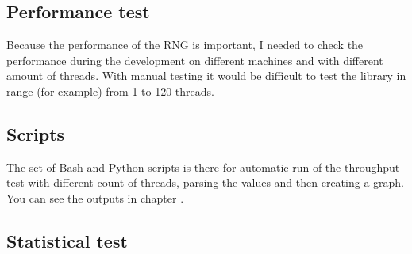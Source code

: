 \subsection{Performance test}
Because the performance of the RNG is important, I needed to check the performance during the development on different machines and with different amount of threads. With manual testing it would be difficult to test the library in range (for example) from 1 to 120 threads.

\subsection{Scripts}
The set of Bash and Python scripts is there for automatic run of the throughput test with different count of threads, parsing the values and then creating a graph. You can see the outputs in chapter .

\subsection{Statistical test}


